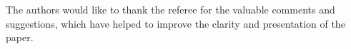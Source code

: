 \documentclass[11pt,a4paper]{amsart}
\theoremstyle{plain}
\theoremstyle{definition}
\theoremstyle{remark}
\begin{document}
The authors would like to thank the referee for the valuable comments and suggestions, which have helped to improve the clarity and presentation of the paper.

 
 
 
 


 
 

 

















                                                        
                                                        
                                                            
                                                            
                                                            
\end{document}
